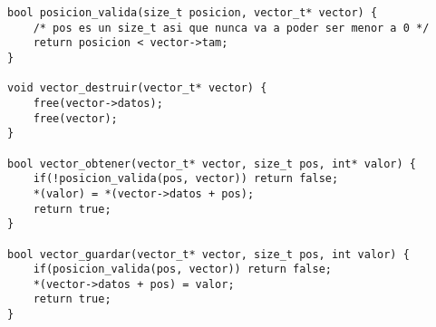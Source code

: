 \documentclass{article}
\begin{document}
\begin{verbatim}
bool posicion_valida(size_t posicion, vector_t* vector) {
    /* pos es un size_t asi que nunca va a poder ser menor a 0 */
    return posicion < vector->tam;
}

void vector_destruir(vector_t* vector) {
    free(vector->datos);
    free(vector);
}

bool vector_obtener(vector_t* vector, size_t pos, int* valor) {
    if(!posicion_valida(pos, vector)) return false;
    *(valor) = *(vector->datos + pos);
    return true;
}

bool vector_guardar(vector_t* vector, size_t pos, int valor) {
    if(posicion_valida(pos, vector)) return false;
    *(vector->datos + pos) = valor;
    return true;
}
\end{verbatim}
\end{document}
